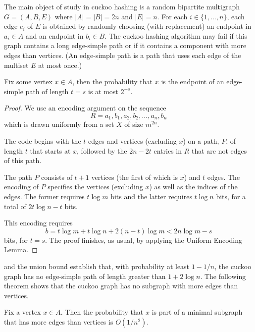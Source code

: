 \documentclass{patmorin}
\begin{document}
The main object of study in cuckoo hashing is a random bipartite
multigraph $G=(A,B,E)$ where $|A|=|B|=2n$ and $|E|=n$.  For each
$i\in\{1,\ldots,n\}$, each edge $e_i$ of $E$ is obtained by randomly
choosing (with replacement) an endpoint in $a_i\in A$ and an endpoint
in $b_i\in B$.  The cuckoo hashing algorithm may fail if this graph
contains a long edge-simple path or if it contains a component with more
edges than vertices.  (An edge-simple path is a path that uses each edge
of the multiset $E$ at most once.)

\begin{thm}
  Fix some vertex $x\in A$, then the probability that $x$ is the
  endpoint of an edge-simple path of length $t=s$ is at most $2^{-s}$.
\end{thm}

\begin{proof}
  We use an encoding argument on the sequence
  \[
     R=a_1,b_1,a_2,b_2,\ldots,a_n,b_n
  \]
  which is drawn uniformly from a set $X$ of size $m^{2n}$.

  The code begins with the $t$ edges and vertices (excluding $x$) on a
  path, $P$, of length $t$ that starts at $x$, followed by the $2n-2t$
  entries in $R$ that are not edges of this path.

  The path $P$ consists of $t+1$ vertices (the first of which is $x$) and
  $t$ edges. The encoding of $P$ specifies the vertices (excluding $x$)
  as well as the indices of the edges. The former requires $t\log m$ bits
  and the latter requires $t\log n$ bits, for a total of $2t\log n-t$ bits.

  This encoding requires
  \[
    b = t\log m + t\log n + 2(n-t)\log m < 2n\log m - s
  \]
  bits, for $t=s$. The proof finishes, as usual, by applying the
  Uniform Encoding Lemma.
\end{proof}

 and the union bound establish that, with probability
at least $1-1/n$, the cuckoo graph has no edge-simple path of length
greater than $1+2\log n$. The following theorem shows that the cuckoo
graph has no subgraph with more edges than vertices.

\begin{thm}
  Fix a vertex $x\in A$.  Then the probability that $x$ is part of a
  minimal subgraph that has more edges than vertices is $O(1/n^2)$.
\end{thm}
\end{document}
